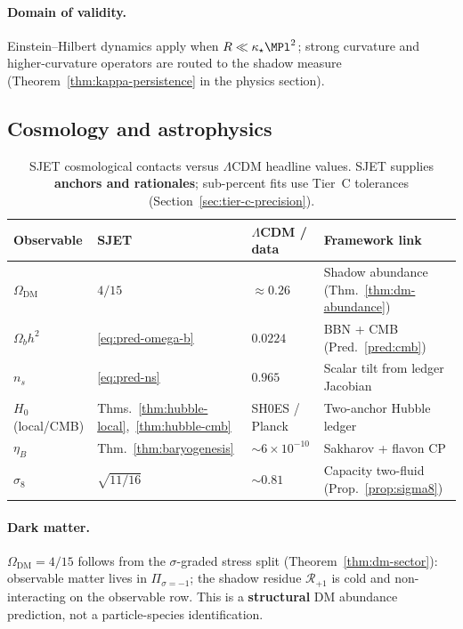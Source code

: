 \paragraph{Domain of validity.}
Einstein--Hilbert dynamics apply when $R\ll\kappa_\star\MPl^2$; strong
curvature and higher-curvature operators are routed to the shadow measure
(Theorem~\ref{thm:kappa-persistence} in the physics section).

\subsection{Cosmology and astrophysics}
\label{sec:standard-theories:cosmo}

\begin{table}[ht]
\centering
\small
\renewcommand{\arraystretch}{1.14}
\begin{tabular}{@{}llll@{}}
\toprule
\textbf{Observable} & \textbf{SJET} & \textbf{$\Lambda$CDM / data} &
\textbf{Framework link} \\
\midrule
$\Omega_{\mathrm{DM}}$ &
  $4/15$ &
  $\approx 0.26$ &
  Shadow abundance (Thm.~\ref{thm:dm-abundance}) \\
$\Omega_b h^2$ &
  \eqref{eq:pred-omega-b} &
  $0.0224$ &
  BBN + CMB (Pred.~\ref{pred:cmb}) \\
$n_s$ &
  \eqref{eq:pred-ns} &
  $0.965$ &
  Scalar tilt from ledger Jacobian \\
$H_0$ (local/CMB) &
  Thms.~\ref{thm:hubble-local},~\ref{thm:hubble-cmb} &
  SH0ES / Planck &
  Two-anchor Hubble ledger \\
$\eta_B$ &
  Thm.~\ref{thm:baryogenesis} &
  $\sim 6\times 10^{-10}$ &
  Sakharov + flavon CP \\
$\sigma_8$ &
  $\sqrt{11/16}$ &
  $\sim 0.81$ &
  Capacity two-fluid (Prop.~\ref{prop:sigma8}) \\
\bottomrule
\end{tabular}
\caption{SJET cosmological contacts versus $\Lambda$CDM headline values.
SJET supplies \textbf{anchors and rationales}; sub-percent fits use Tier~C
tolerances (Section~\ref{sec:tier-c-precision}).}
\label{tab:cosmo-bridge}
\end{table}

\paragraph{Dark matter.}
$\Omega_{\mathrm{DM}}=4/15$ follows from the $\sigma$-graded stress split
(Theorem~\ref{thm:dm-sector}): observable matter lives in
$\Pi_{\sigma=-1}$; the shadow residue $\mathcal{R}_{+1}$ is cold and
non-interacting on the observable row. This is a \textbf{structural} DM
abundance prediction, not a particle-species identification.

